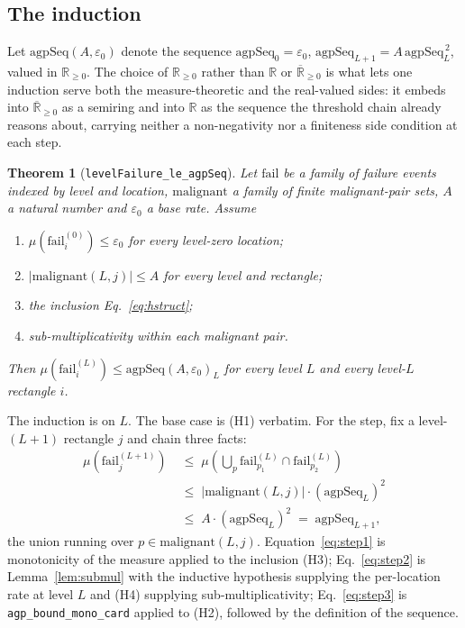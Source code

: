 \documentclass[aps,prx,reprint,nofootinbib,superscriptaddress]{revtex4-2}
\newtheorem{theorem}{Theorem}
\begin{document}
\subsection{The induction}

Let $\mathrm{agpSeq}(A,\varepsilon_0)$ denote the sequence
$\mathrm{agpSeq}_0 = \varepsilon_0$, $\mathrm{agpSeq}_{L+1} = A\,
\mathrm{agpSeq}_L^{\,2}$, valued in $\mathbb{R}_{\ge 0}$. The choice of
$\mathbb{R}_{\ge 0}$ rather than $\mathbb{R}$ or
$\overline{\mathbb{R}}_{\ge 0}$ is what lets one induction serve both the
measure-theoretic and the real-valued sides: it embeds into
$\overline{\mathbb{R}}_{\ge 0}$ as a semiring and into $\mathbb{R}$ as the
sequence the threshold chain already reasons about, carrying neither a
non-negativity nor a finiteness side condition at each step.

\begin{theorem}[\texttt{levelFailure\_le\_agpSeq}]
\label{thm:levels}
Let $\mathrm{fail}$ be a family of failure events indexed by level and location,
$\mathrm{malignant}$ a family of finite malignant-pair sets, $A$ a natural number
and $\varepsilon_0$ a base rate. Assume
\begin{enumerate}
\item[(H1)] $\mu(\mathrm{fail}^{(0)}_i) \le \varepsilon_0$ for every level-zero
  location;
\item[(H2)] $|\mathrm{malignant}(L,j)| \le A$ for every level and rectangle;
\item[(H3)] the inclusion Eq.~\eqref{eq:hstruct};
\item[(H4)] sub-multiplicativity within each malignant pair.
\end{enumerate}
Then $\mu(\mathrm{fail}^{(L)}_i) \le \mathrm{agpSeq}(A,\varepsilon_0)_L$ for
every level $L$ and every level-$L$ rectangle $i$.
\end{theorem}

The induction is on $L$. The base case is (H1) verbatim. For the step, fix a
level-$(L{+}1)$ rectangle $j$ and chain three facts:
\begin{align}
  \mu\!\left(\mathrm{fail}^{(L+1)}_j\right)
    &\;\le\; \mu\!\left(\bigcup_{p} \mathrm{fail}^{(L)}_{p_1} \cap
       \mathrm{fail}^{(L)}_{p_2}\right)
    \label{eq:step1} \\
    &\;\le\; \left|\mathrm{malignant}(L,j)\right| \cdot
       \left(\mathrm{agpSeq}_L\right)^2
    \label{eq:step2} \\
    &\;\le\; A \cdot \left(\mathrm{agpSeq}_L\right)^2
    \;=\; \mathrm{agpSeq}_{L+1},
    \label{eq:step3}
\end{align}
the union running over $p \in \mathrm{malignant}(L,j)$.
Equation~\eqref{eq:step1} is monotonicity of the measure applied to the
inclusion (H3); Eq.~\eqref{eq:step2} is Lemma~\ref{lem:submul} with the
inductive hypothesis supplying the per-location rate at level $L$ and (H4)
supplying sub-multiplicativity; Eq.~\eqref{eq:step3} is
\texttt{agp\_bound\_mono\_card} applied to (H2), followed by the definition of
the sequence.
\end{document}
